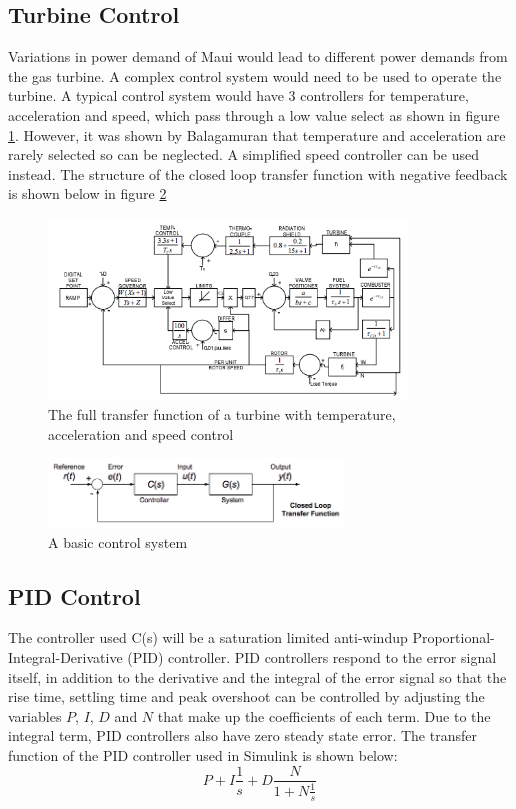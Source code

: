 \subsection{Turbine Control}
Variations in power demand of Maui would lead to different power demands from the gas turbine. A complex control system would need to be used to operate the turbine. A typical control system would have 3 controllers for temperature, acceleration and speed, which pass through a low value select as shown in figure \ref{fig:turbinecont}. However, it was shown by Balagamuran \cite{balagamuran} that temperature and acceleration are rarely selected so can be neglected. A simplified speed controller can be used instead. The structure of the closed loop transfer function with negative feedback is shown below in figure \ref{fig:control}

\begin{figure} [h]
\centering
\includegraphics[width=0.85\textwidth]{./pictures/turbinecont.png}
  \caption{The full transfer function of a turbine with temperature, acceleration and speed control \cite{balagamuran}} \label{fig:turbinecont}
  \end{figure}
  
\begin{figure} [h]
\centering
\includegraphics[width=0.7\textwidth]{./pictures/controlsystem.png}
  \caption{A basic control system \cite{A2notes}} \label{fig:control}
  \end{figure}
\subsection{PID Control}

The controller used C(s) will be a saturation limited anti-windup Proportional-Integral-Derivative (PID) controller. PID controllers respond to the error signal itself, in addition to the derivative and the integral of the error signal so that the rise time, settling time and peak overshoot can be controlled by adjusting the variables $P$, $I$, $D$ and $N$ that make up the coefficients of each term. Due to the integral term, PID controllers also have zero steady state error. The transfer function of the PID controller used in Simulink is shown below:
\begin{equation}
P + I\frac{1}{s} + D\frac{N}{1+N\frac{1}{s}}
\end{equation}

